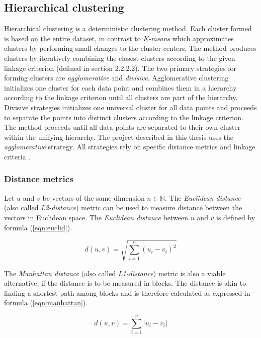\subsection{Hierarchical clustering}

Hierarchical clustering is a deterministic clustering method. Each cluster formed is based on the entire dataset, in contrast to \textit{K-means} which approximates clusters by performing small changes to the cluster centers. The method produces clusters by iteratively combining the closest clusters according to the given linkage criterion (defined in section 2.2.2.2). The two primary strategies for forming clusters are \textit{agglomerative} and \textit{divisive}. Agglomerative clustering initializes one cluster for each data point and combines them in a hierarchy according to the linkage criterion until all clusters are part of the hierarchy. Divisive strategies initializes one universal cluster for all data points and proceeds to separate the points into distinct clusters according to the linkage criterion. The method proceeds until all data points are separated to their own cluster within the unifying hierarchy. The project described in this thesis uses the \textit{agglomerative} strategy. All strategies rely on specific distance metrics and linkage criteria \cite{murtagh1983survey}.

\subsubsection{Distance metrics}
Let $u$ and $v$ be vectors of the same dimension $n \in \mathbb{N}$. The \textit{Euclidean distance} (also called \textit{L2-distance}) metric can be used to measure distance between the vectors in Euclidean space. The \textit{Euclidean distance} between $u$ and $v$ is defined by formula (\ref{eqn:euclid}).

\begin{equation}
\label{eqn:euclid}
d(u, v) = \sqrt{\sum_{i=1}^n (u_i - v_i)^2} 
\end{equation}

The \textit{Manhattan distance} (also called \textit{L1-distance}) metric is also a viable alternative, if the distance is to be measured in blocks. The distance is akin to finding a shortest path among blocks and is therefore calculated as expressed in formula (\ref{eqn:manhattan}).

\begin{equation}
\label{eqn:manhattan}
d(u, v) = \sum_{i=1}^n |u_i - v_i|
\end{equation}

